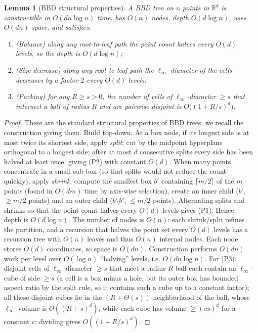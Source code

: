 \documentclass{amsart}
\newtheorem{lemma}{Lemma}
\newcommand{\R}{\mathbb{R}}
\begin{document}
\begin{lemma}[BBD structural properties]\label{lem:bbd}
A BBD tree on $n$ points in $\R^d$ is constructible in $O(dn\log n)$ time, has $O(n)$
nodes, depth $O(d\log n)$, uses $O(dn)$ space, and satisfies:
\begin{enumerate}
\item[(P1)] \emph{(Balance)} along any root-to-leaf path the point count halves every
$O(d)$ levels, so the depth is $O(d\log n)$;
\item[(P2)] \emph{(Size decrease)} along any root-to-leaf path the $\ell_\infty$
diameter of the cells decreases by a factor $2$ every $O(d)$ levels;
\item[(P3)] \emph{(Packing)} for any $R\ge s>0$, the number of cells of
$\ell_\infty$-diameter $\ge s$ that intersect a ball of radius $R$ and are pairwise
disjoint is $O\big((1+R/s)^d\big)$.
\end{enumerate}
\end{lemma}
\begin{proof}
These are the standard structural properties of BBD trees; we recall the construction
giving them.  Build top-down.  At a box node, if its longest side is at most twice its
shortest side, apply \emph{split}: cut by the midpoint hyperplane orthogonal to a
longest side; after at most $d$ consecutive splits every side has been halved at least
once, giving (P2) with constant $O(d)$.  When many points concentrate in a small
sub-box (so that splits would not reduce the count quickly), apply \emph{shrink}:
compute the smallest box $b'$ containing $\lceil m/2\rceil$ of the $m$ points (found in
$O(dm)$ time by axis-wise selection), create an inner child ($b'$, $\ge m/2$ points)
and an outer child ($b\setminus b'$, $\le m/2$ points).  Alternating splits and
shrinks so that the point count halves every $O(d)$ levels gives (P1).  Hence depth is
$O(d\log n)$.  The number of nodes is $O(n)$: each shrink/split refines the partition,
and a recursion that halves the point set every $O(d)$ levels has a recursion tree with
$O(n)$ leaves and thus $O(n)$ internal nodes.  Each node stores $O(d)$ coordinates, so
space is $O(dn)$.  Construction performs $O(dn)$ work per level over $O(\log n)$
``halving'' levels, i.e. $O(dn\log n)$.  For (P3): disjoint cells of
$\ell_\infty$-diameter $\ge s$ that meet a radius-$R$ ball each contain an
$\ell_\infty$-cube of side $\ge s$ (a cell is a box minus a hole, but its outer box has
bounded aspect ratio by the split rule, so it contains such a cube up to a constant
factor); all these disjoint cubes lie in the $(R+\Theta(s))$-neighborhood of the ball,
whose $\ell_\infty$-volume is $O((R+s)^d)$, while each cube has volume $\ge(cs)^d$ for
a constant $c$; dividing gives $O((1+R/s)^d)$.
\end{proof}
\end{document}

